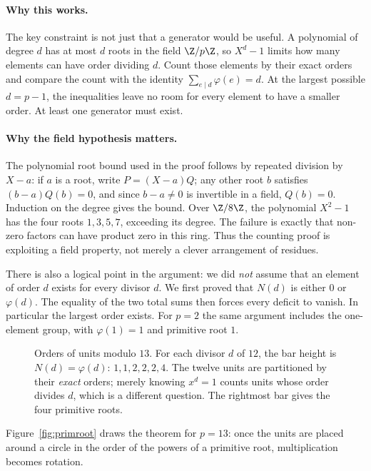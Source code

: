 \paragraph{Why this works.}
The key constraint is not just that a generator would be useful. A polynomial of degree $d$ has at most $d$ roots in the field $\Z/p\Z$, so $X^d-1$ limits how many elements can have order dividing $d$. Count those elements by their exact orders and compare the count with the identity $\sum_{e\mid d}\varphi(e)=d$. At the largest possible $d=p-1$, the inequalities leave no room for every element to have a smaller order. At least one generator must exist.

\paragraph{Why the field hypothesis matters.}
The polynomial root bound used in the proof follows by repeated division by
$X-a$: if $a$ is a root, write $P=(X-a)Q$; any other root $b$ satisfies
$(b-a)Q(b)=0$, and since $b-a\ne0$ is invertible in a field, $Q(b)=0$.
Induction on the degree gives the bound. Over $\Z/8\Z$, the polynomial
$X^2-1$ has the four roots $1,3,5,7$, exceeding its degree. The failure is
exactly that non-zero factors can have product
zero in this ring. Thus the counting proof is exploiting a field property,
not merely a clever arrangement of residues.

There is also a logical point in the argument: we did \emph{not} assume that
an element of order $d$ exists for every divisor $d$. We first proved that
$N(d)$ is either $0$ or $\varphi(d)$. The equality of the two total sums then
forces every deficit to vanish. In particular the largest order exists.
For $p=2$ the same argument includes the one-element group, with
$\varphi(1)=1$ and primitive root $1$.

\begin{figure}[ht]
\centering
{}
\caption{Orders of units modulo $13$. For each divisor $d$ of $12$, the bar
height is $N(d)=\varphi(d)$: $1,1,2,2,2,4$. The twelve units are partitioned
by their \emph{exact} orders; merely knowing $x^d=1$ counts units whose order
divides $d$, which is a different question. The rightmost bar gives the four
primitive roots.}
\label{fig:ordercounts}
\end{figure}

Figure~\ref{fig:primroot} draws the theorem for $p=13$: once the units are placed around a circle in the order of the powers of a primitive root, multiplication becomes rotation.

